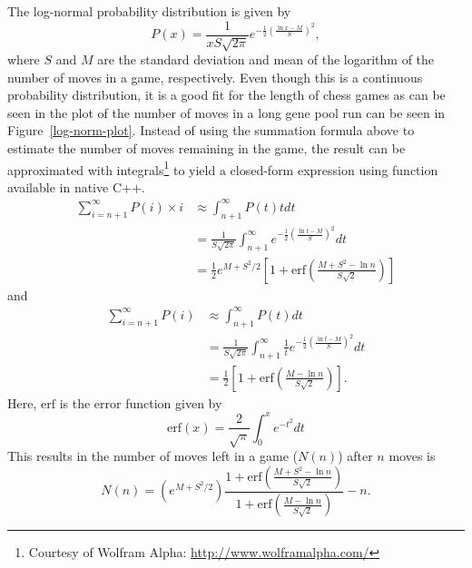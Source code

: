 \documentclass[letterpaper]{article}
\newcommand{\cpp}{C{\nobreak+}{\nobreak+}}
\renewcommand{\_}{\allowbreak\textunderscore\allowbreak}
\begin{document}
The log-normal probability distribution is given by
\[P(x) = \frac{1}{xS\sqrt{2\pi}} e^{-\frac{1}{2}{\left(\frac{\ln{x} - M}{S}\right)}^2},\]
where \(S\) and \(M\) are the standard deviation and mean of the logarithm of the number of moves in a game, respectively. Even though this is a continuous probability distribution, it is a good fit for the length of chess games as can be seen in the plot of the number of moves in a long gene pool run can be seen in Figure~\ref{log-norm-plot}. Instead of using the summation formula above to estimate the number of moves remaining in the game, the result can be approximated with integrals\footnote{Courtesy of Wolfram Alpha: \url{http://www.wolframalpha.com/}} to yield a closed-form expression using function available in native \cpp.
\begin{align*}
\sum_{i = n + 1}^\infty P(i)\times{}i &\approx \int_{n+1}^\infty P(t)t dt \\
	&= \frac{1}{S\sqrt{2\pi}} \int_{n+1}^\infty e^{-\frac{1}{2}{\left(\frac{\ln{t} - M}{S}\right)}^2}dt\\
	&= \frac{1}{2}e^{M + S^2/2}{\left[1 + \textrm{erf}{\left(\frac{M + S^2 - \ln n}{S\sqrt{2}}\right)}\right]}
\end{align*}
and
\begin{align*}
\sum_{i = n + 1}^\infty P(i) &\approx \int_{n+1}^\infty P(t)dt \\
	&= \frac{1}{S\sqrt{2\pi}} \int_{n+1}^\infty \frac{1}{t} e^{-\frac{1}{2}{\left(\frac{\ln{t} - M}{S}\right)}^2}dt \\
	&= \frac{1}{2}\left[1 + \textrm{erf}\left(\frac{M-\ln n}{S\sqrt{2}}\right)\right].
\end{align*}
Here, \(\textrm{erf}\) is the error function given by
\[
\textrm{erf}(x) = \frac{2}{\sqrt{\pi}}\int_0^x e^{-t^2}dt
\]
This results in the number of moves left in a game (\(N(n)\)) after \(n\) moves is
\[
N(n) = \left(e^{M + S^2/2}\right) \frac
{1 + \textrm{erf}\left(\frac{M + S^2 - \ln n}{S\sqrt{2}}\right)}
{1 + \textrm{erf}\left(\frac{M-\ln n}{S\sqrt{2}}\right)}
- n.
\]
\end{document}
